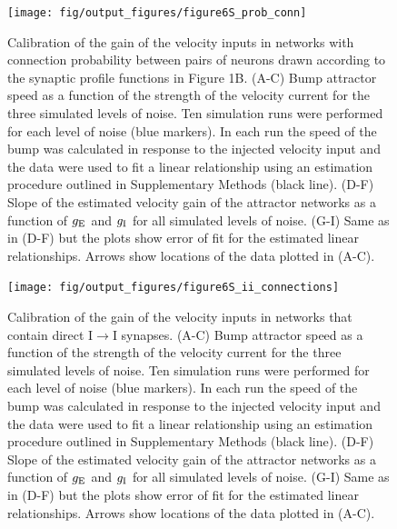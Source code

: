 \documentclass[a4paper,12pt]{article}
\newcommand{\ssc}[3]{\ensuremath{#1_{\text{#2}_{\text{#3}}}}}
\newcommand{\gE      }{\ssc{g}      {\scriptsize{E}}{}}
\newcommand{\gI      }{\ssc{g}      {\scriptsize{I}}{}}
\begin{document}
\begin{figure}[ht!]
    \internallinenumbers
    \centering
        \texttt{[image: fig/output\_figures/figure6S\_prob\_conn]}
    \caption{Calibration of the gain of the velocity inputs in networks with
    connection probability between pairs of neurons drawn according to the
    synaptic profile functions in Figure 1B. (A-C) Bump attractor speed as a
    function of the strength of the velocity current for the three simulated
    levels of noise. Ten simulation runs were performed for each level of noise
    (blue markers). In each run the speed of the bump was calculated in
    response to the injected velocity input and the data were used to fit a
    linear relationship using an estimation procedure outlined in Supplementary
    Methods (black line). (D-F) Slope of the estimated velocity gain of the
    attractor networks as a function of $\gE$ and $\gI$ for all simulated
    levels of noise. (G-I) Same as in (D-F) but the plots show error of fit for
    the estimated linear relationships. Arrows show locations of the data
    plotted in (A-C).}
\end{figure}

\clearpage

\begin{figure}[ht!]
    \internallinenumbers
    \centering
        \texttt{[image: fig/output\_figures/figure6S\_ii\_connections]}
    \caption{Calibration of the gain of the velocity inputs in networks that
    contain direct I$\rightarrow$I synapses. (A-C) Bump attractor speed as a
    function of the strength of the velocity current for the three simulated
    levels of noise. Ten simulation runs were performed for each level of noise
    (blue markers). In each run the speed of the bump was calculated in
    response to the injected velocity input and the data were used to fit a
    linear relationship using an estimation procedure outlined in Supplementary
    Methods (black line). (D-F) Slope of the estimated velocity gain of the
    attractor networks as a function of $\gE$ and $\gI$ for all simulated
    levels of noise. (G-I) Same as in (D-F) but the plots show error of fit for
    the estimated linear relationships. Arrows show locations of the data
    plotted in (A-C).}
\end{figure}

\clearpage
\end{document}
